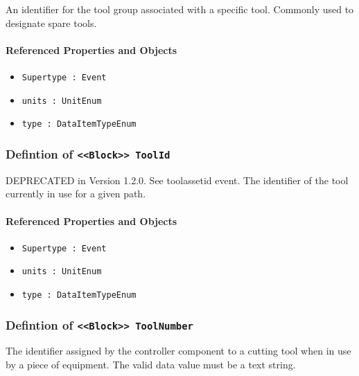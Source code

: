 An identifier for the tool group associated with a specific tool. Commonly used to designate spare tools.

\FloatBarrier
\paragraph{Referenced Properties and Objects}

\begin{itemize}
\item \texttt{Supertype : Event}

\item \texttt{units : UnitEnum}

\item \texttt{type : DataItemTypeEnum}

\end{itemize}
\FloatBarrier
\subsubsection{Defintion of \texttt{<<Block>> ToolId}}
  \label{type:ToolId}

\FloatBarrier

DEPRECATED in Version 1.2.0.   See toolassetid event. The identifier of the tool currently in use for a given path.

\FloatBarrier
\paragraph{Referenced Properties and Objects}

\begin{itemize}
\item \texttt{Supertype : Event}

\item \texttt{units : UnitEnum}

\item \texttt{type : DataItemTypeEnum}

\end{itemize}
\FloatBarrier
\subsubsection{Defintion of \texttt{<<Block>> ToolNumber}}
  \label{type:ToolNumber}

\FloatBarrier

The identifier assigned by the controller component to a cutting tool when in use by a piece of equipment. 
 The valid data value must be a text string.

